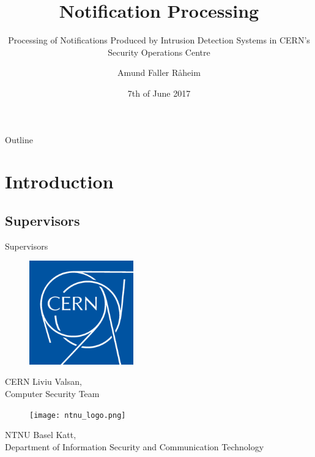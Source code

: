 \documentclass{beamer}
\title{Notification Processing}
\subtitle{Processing of Notifications Produced by Intrusion Detection Systems in CERN's Security Operations Centre}
\author{Amund Faller Råheim}
\institute[NTNU] %
{
  Bachelor of Engineering in Computer Science\\
  Norwegian University of Science and Technology
  }
\date{7th of June 2017}
\begin{document}
\begin{frame}
  \titlepage
\end{frame}

\begin{frame}{Outline}
  \tableofcontents
\end{frame}


\section{Introduction}
\subsection{Supervisors}
\begin{frame}{Supervisors}
\begin{minipage}{0.4\textwidth}
\begin{figure}[H]
\includegraphics[width=0.4\textwidth]{cern_logo.png}
\end{figure}
\end{minipage} \hfill
\begin{minipage}{0.55\textwidth}
\begin{block}{CERN}
Liviu Valsan, \\Computer Security Team
\end{block}
\end{minipage}

\begin{minipage}{0.4\textwidth}
\begin{figure}[H]
\texttt{[image: ntnu\_logo.png]}
\end{figure}
\end{minipage} \hfill
\begin{minipage}{0.55\textwidth}
\begin{block}{NTNU}
Basel Katt, \\Department of Information Security and Communication Technology
\end{block}
\end{minipage}
\end{frame}
\end{document}
